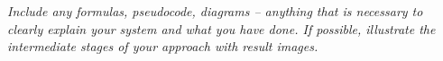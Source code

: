 
\textit{Include any formulas, pseudocode, diagrams -- anything that is necessary to clearly explain your system and what you have done. If possible, illustrate the intermediate stages of your approach with result images.}

